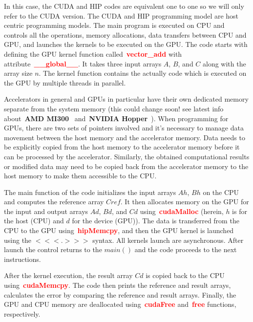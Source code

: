 


\par
In this case, the CUDA and HIP codes are equivalent one to one so we will only refer to the CUDA version.
The CUDA and HIP programming model are host centric programming models.
The main program is executed on CPU and controls all the operations, memory allocations, data transfers between CPU and GPU, and launches the kernels to be executed on the GPU.
The code starts with defining the GPU kernel function called~\textbf{\textcolor{red}{vector\_add}} with attribute~\textbf{\textcolor{red}{\_\_global\_\_}}.
It takes three input arrays $A$, $B$, and $C$ along with the array size $n$.
The kernel function contains the actually code which is executed on the GPU by multiple threads in parallel.


\par
Accelerators in general and GPUs in particular have their own dedicated memory separate from the system memory (this could change soon! see latest info about~\textbf{AMD MI300}~\cite{amd_mi300} and~\textbf{NVIDIA Hopper}~\cite{nvidia_hopper}).
When programming for GPUs, there are two sets of pointers involved and it’s necessary to manage data movement between the host memory and the accelerator memory.
Data needs to be explicitly copied from the host memory to the accelerator memory before it can be processed by the accelerator.
Similarly, the obtained computational results or modified data may need to be copied back from the accelerator memory to the host memory to make them accessible to the CPU.


\par
The main function of the code initializes the input arrays $Ah$, $Bh$ on the CPU and computes the reference array $Cref$.
It then allocates memory on the GPU for the input and output arrays $Ad$, $Bd$, and $Cd$ using~\textbf{\textcolor{red}{cudaMalloc}} (herein, $h$ is for the host (CPU) and $d$ for the device (GPU)).
The data is transferred from the CPU to the GPU using~\textbf{\textcolor{red}{hipMemcpy}}, and then the GPU kernel is launched using the $<<<.>>>$ syntax.
All kernels launch are asynchronous.
After launch the control returns to the $main()$ and the code proceeds to the next instructions.


\par
After the kernel execution, the result array $Cd$ is copied back to the CPU using~\textbf{\textcolor{red}{cudaMemcpy}}.
The code then prints the reference and result arrays, calculates the error by comparing the reference and result arrays.
Finally, the GPU and CPU memory are deallocated using~\textbf{\textcolor{red}{cudaFree}} and~\textbf{\textcolor{red}{free}} functions, respectively.


